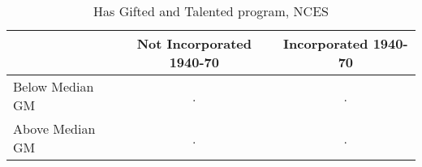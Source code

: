 \begin{table}[htbp]\centering
\caption{Has Gifted and Talented program, NCES}
\begin{tabular}{l*{2}{c}}
\hline\hline
                    &Not Incorporated 1940-70&Incorporated 1940-70\\
\hline
Below Median GM     &           .&           .\\
Above Median GM     &           .&           .\\
\hline\hline
\end{tabular}
\end{table}
